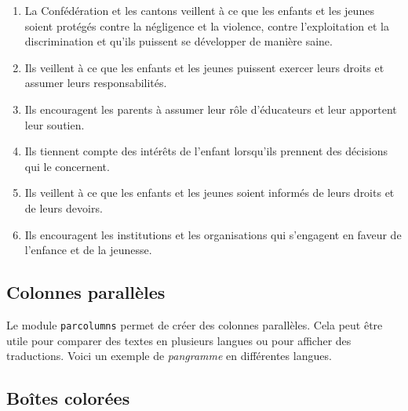 \begin{multicols}{2}
    \begin{enumerate}
        \item La Confédération et les cantons veillent à ce que les enfants et les jeunes soient protégés contre la négligence et la violence, contre l'exploitation et la discrimination et qu'ils puissent se développer de manière saine.
        \item Ils veillent à ce que les enfants et les jeunes puissent exercer leurs droits et assumer leurs responsabilités.
        \item Ils encouragent les parents à assumer leur rôle d'éducateurs et leur apportent leur soutien.
        \item Ils tiennent compte des intérêts de l'enfant lorsqu'ils prennent des décisions qui le concernent.
        \item Ils veillent à ce que les enfants et les jeunes soient informés de leurs droits et de leurs devoirs.
        \item Ils encouragent les institutions et les organisations qui s'engagent en faveur de l'enfance et de la jeunesse.
    \end{enumerate}
\end{multicols}

\subsection{Colonnes parallèles}

Le module \verb!parcolumns! permet de créer des colonnes parallèles. Cela peut être utile pour comparer des textes en plusieurs langues ou pour afficher des traductions. Voici un exemple de \emph{pangramme} en différentes langues.\par

\begin{parcolumns}{4}
\end{parcolumns}

\subsection{Boîtes colorées}

